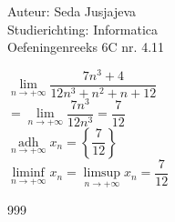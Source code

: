 \documentclass[a4paper]{article}
\newcommand{\limit}{\lim\limits}
\begin{document}
\noindent \large Auteur: Seda Jusjajeva\\
\noindent \large Studierichting: Informatica\\
\noindent \large Oefeningenreeks 6C nr. 4.11\\

\medskip

\normalsize


$\limit_{n \to +\infty} \dfrac{7n^3 + 4}{12n^3 + n^2 + n + 12}$ \\

$= \limit_{n \to +\infty} \dfrac{7n^3}{12n^3} = \dfrac{7}{12}$ \\

$\operatorname*{adh}\limits_{n \to +\infty} x_n = \left\{\dfrac{7}{12}\right\}$ \\

$\liminf\limits_{n \to +\infty} x_n = \limsup\limits_{n \to +\infty} x_n = \dfrac{7}{12}$ \\



\begin{thebibliography}{999}
\end{thebibliography}
\end{document}
